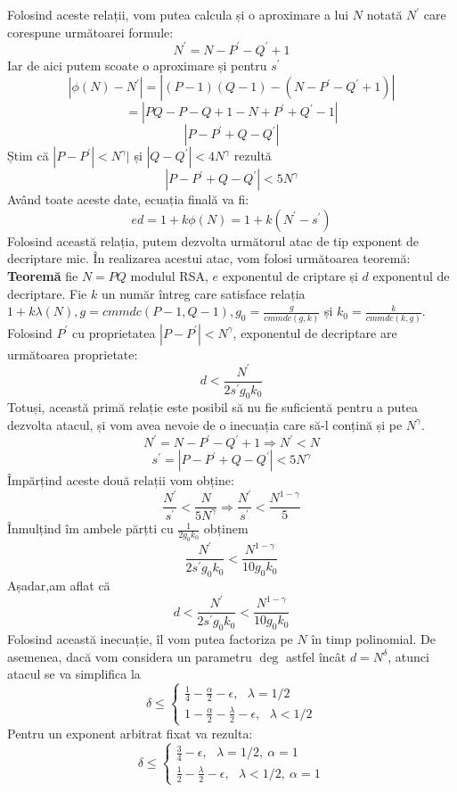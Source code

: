\documentclass[12]{report}
\begin{document}
Folosind aceste relații, vom putea calcula și o aproximare a lui $N$ notată $N^{'}$ care corespune următoarei formule:
$$ N^{'}= N-P^{'} - Q^{'} +1 $$
Iar de aici putem scoate o aproximare și pentru $s^{'}$
$$ \left| \phi(N) - N^{'} \right| = | (P-1)(Q-1) - (N-P^{'} - Q^{'} +1) | $$
$$ = |PQ - P - Q + 1 - N + P^{'} + Q^{'} -1 | $$
$$|P-P^{'} + Q - Q^{'}| $$
Știm că $ |P-P^{'}| < N^{\gamma} | $ și $|Q-Q^{'}| < 4N^{\gamma}$ rezultă
$$ | P-P^{'} + Q -Q^{'}| < 5N^{\gamma} $$ 
Având toate aceste date, ecuația finală va fi:
$$ ed=1+k\phi(N) =1 + k(N^{'} -s^{'})$$
Folosind această relația, putem dezvolta următorul atac de tip exponent de decriptare mic. În realizarea acestui atac, vom folosi următoarea teoremă: \\
\textbf{Teoremă} fie $N=PQ$ modulul RSA, $e$ exponentul de criptare și $d$ exponentul de decriptare. Fie $k$ un număr întreg care satisface relația $1 + k \lambda(N),g=cmmdc(P-1,Q-1),g_0=\frac{g}{cmmdc(g,k)}$ și $k_0=\frac{k}{cmmdc(k,g)}$. Folosind $P^{'}$ cu proprietatea $|P - P^{'}|<N^{\gamma}$, exponentul de decriptare are următoarea proprietate:
$$d<\frac{N^{'}}{2s^{'}g_0k_0}$$
Totuși, această primă relație este posibil să nu fie suficientă pentru a putea dezvolta atacul, și vom avea nevoie de o inecuația care să-l conțină și pe $N^{\gamma}$.
$$ N^{'} = N - P^{'} - Q^{'} + 1 \Rightarrow N^{'}  < N$$
$$ s^{'} = |P-P^{'} + Q - Q^{'}| < 5N^{\gamma}$$
Împărțind aceste două relații vom obține:
$$\frac{N^{'}}{s^{'}} < \frac{N}{5N^{\gamma}} \Rightarrow \frac{N^{'}}{s^{'}} < \frac{N^{1-\gamma}}{5} $$
Înmulțind îm ambele părțti cu $\frac{1}{2g_0k_0}$ obținem
$$ \frac{N^{'}}{2s^{'}g_0k_0} < \frac{N^{1-\gamma}}{10g_0k_0}$$
Așadar,am aflat că 
$$ d<\frac{N^{'}}{2s^{'}g_0k_0}<\frac{N^{1-\gamma}}{10g_0k_0}$$
Folosind această inecuație, îl vom putea factoriza pe $N$ în timp polinomial.
De asemenea, dacă vom considera un parametru $\deg$ astfel încât $d=N^{\delta}$, atunci atacul se va simplifica la 
\[
\delta \leqslant
\left\{ 
\begin{array}{c}
\frac{1}{4} - \frac{\alpha}{2} - \epsilon, \ \ \ \lambda=1/2  \\
1 - \frac{\alpha}{2} - \frac{\lambda}{2} - \epsilon, \ \ \ \lambda<1/2  
\end{array}
\right. 
\]
Pentru un exponent arbitrat fixat va rezulta:
\[
\delta \leqslant
\left\{ 
\begin{array}{c}
\frac{3}{4} -  \epsilon, \ \ \ \lambda=1/2 , \ \alpha=1  \\
\frac{1}{2} - \frac{\lambda}{2} - \epsilon, \ \ \ \lambda<1/2, \ \alpha=1 
\end{array}
\right. 
\]
\end{document}

